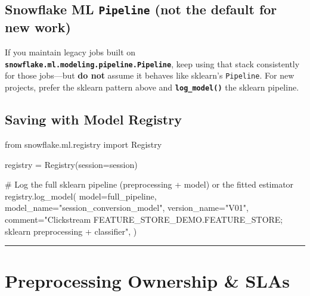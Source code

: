 \documentclass[
  letterpaper,
  DIV=11,
  numbers=noendperiod]{scrreprt}
\newenvironment{Shaded}{\begin{snugshade}}{\end{snugshade}}
\newcommand{\CommentTok}[1]{\textcolor[rgb]{0.37,0.37,0.37}{#1}}
\newcommand{\ImportTok}[1]{\textcolor[rgb]{0.00,0.46,0.62}{#1}}
\newcommand{\NormalTok}[1]{\textcolor[rgb]{0.00,0.23,0.31}{#1}}
\newcommand{\OperatorTok}[1]{\textcolor[rgb]{0.37,0.37,0.37}{#1}}
\newcommand{\StringTok}[1]{\textcolor[rgb]{0.13,0.47,0.30}{#1}}
\begin{document}
\hypertarget{snowflake-ml-pipeline-not-the-default-for-new-work}{%
\subsection{\texorpdfstring{Snowflake ML \texttt{Pipeline} (not the
default for new
work)}{Snowflake ML Pipeline (not the default for new work)}}\label{snowflake-ml-pipeline-not-the-default-for-new-work}}

If you maintain legacy jobs built on
\textbf{\texttt{snowflake.ml.modeling.pipeline.Pipeline}}, keep using
that stack consistently for those jobs---but \textbf{do not} assume it
behaves like sklearn's \texttt{Pipeline}. For new projects, prefer the
sklearn pattern above and \textbf{\texttt{log\_model()}} the sklearn
pipeline.

\hypertarget{saving-with-model-registry}{%
\subsection{Saving with Model
Registry}\label{saving-with-model-registry}}

\begin{Shaded}
\begin{Highlighting}[]
\ImportTok{from}\NormalTok{ snowflake.ml.registry }\ImportTok{import}\NormalTok{ Registry}

\NormalTok{registry }\OperatorTok{=}\NormalTok{ Registry(session}\OperatorTok{=}\NormalTok{session)}

\CommentTok{\# Log the full sklearn pipeline (preprocessing + model) or the fitted estimator}
\NormalTok{registry.log\_model(}
\NormalTok{    model}\OperatorTok{=}\NormalTok{full\_pipeline,}
\NormalTok{    model\_name}\OperatorTok{=}\StringTok{"session\_conversion\_model"}\NormalTok{,}
\NormalTok{    version\_name}\OperatorTok{=}\StringTok{"V01"}\NormalTok{,}
\NormalTok{    comment}\OperatorTok{=}\StringTok{"Clickstream FEATURE\_STORE\_DEMO.FEATURE\_STORE; sklearn preprocessing + classifier"}\NormalTok{,}
\NormalTok{)}
\end{Highlighting}
\end{Shaded}

\begin{center}\rule{0.5\linewidth}{0.5pt}\end{center}

\hypertarget{preprocessing-ownership-slas}{%
\section{Preprocessing Ownership \&
SLAs}\label{preprocessing-ownership-slas}}
\end{document}
